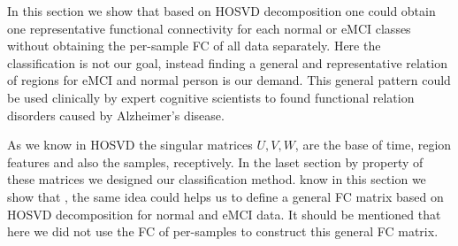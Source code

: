 \documentclass[preprint,12pt]{elsarticle}
\begin{document}

%	


In this section we show that based on HOSVD decomposition one could  obtain  one representative functional connectivity for each normal or eMCI classes without obtaining the per-sample FC of all data separately. Here the classification is not our goal, instead  finding a general and representative
relation of regions for eMCI and normal person is our demand. This general pattern could be used clinically by expert cognitive scientists to found  
functional relation disorders caused by Alzheimer's disease.

As we know in HOSVD  the singular matrices $U,V,W$, are the base of time, region features and also the samples, receptively. In the laset section by property of these matrices we designed our classification method.  know in this section we show that
, the same idea could helps us to define a general FC matrix based on HOSVD decomposition for normal and
eMCI data. It should be mentioned that here we did not use the FC of per-samples to construct this general FC matrix.
\end{document}
